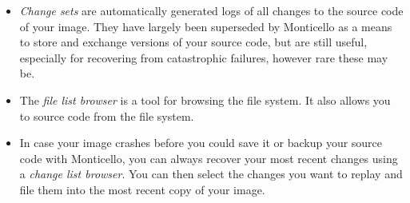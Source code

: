 \documentclass[a4paper,10pt,twoside]{book}
\begin{document}
\begin{itemize}
  \item \emph{Change sets} are automatically generated logs of all changes to the source code of your image. They have largely been superseded by Monticello as a means to store and exchange versions of your source code, but are still useful, especially for recovering from catastrophic failures, however rare these may be.
  \item The \emph{file list browser} is a tool for browsing the file system. It also allows you to  source code from the file system.
  \item In case your image crashes before you could save it or backup your source code with Monticello, you can always recover your most recent changes using a \emph{change list browser}. You can then select the changes you want to replay and file them into the most recent copy of your image.
\end{itemize}

\ifx\wholebook\relax\else
\end{document}
